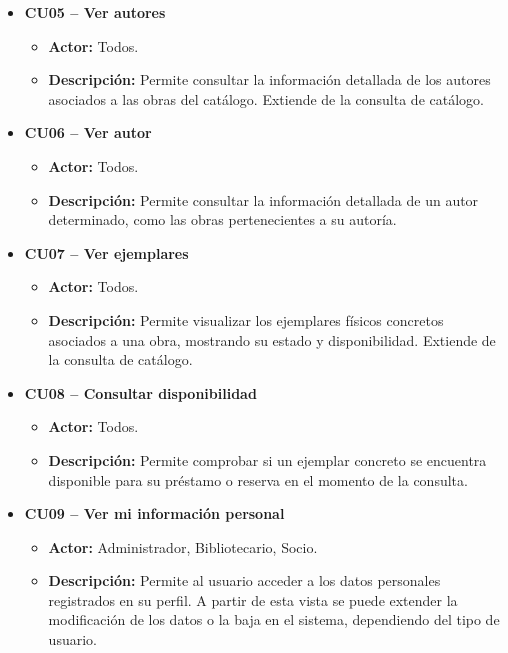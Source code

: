 \begin{itemize}
	\item \textbf{CU05 -- Ver autores}
	\begin{itemize}
		\item \textbf{Actor:} Todos.
		\item \textbf{Descripción:} Permite consultar la información detallada de los autores asociados a las obras del catálogo. Extiende de la consulta de catálogo.
	\end{itemize}
	
	\item \textbf{CU06 -- Ver autor}
	\begin{itemize}
		\item \textbf{Actor:} Todos.
		\item \textbf{Descripción:} Permite consultar la información detallada de un autor determinado, como las obras pertenecientes a su autoría.
	\end{itemize}
	
	\item \textbf{CU07 -- Ver ejemplares}
	\begin{itemize}
		\item \textbf{Actor:} Todos.
		\item \textbf{Descripción:} Permite visualizar los ejemplares físicos concretos asociados a una obra, mostrando su estado y disponibilidad. Extiende de la consulta de catálogo.
	\end{itemize}
	
	\item \textbf{CU08 -- Consultar disponibilidad}
	\begin{itemize}
		\item \textbf{Actor:} Todos.
		\item \textbf{Descripción:} Permite comprobar si un ejemplar concreto se encuentra disponible para su préstamo o reserva en el momento de la consulta.
	\end{itemize}
	
	\item \textbf{CU09 -- Ver mi información personal}
	\begin{itemize}
		\item \textbf{Actor:} Administrador, Bibliotecario, Socio.
		\item \textbf{Descripción:} Permite al usuario acceder a los datos personales registrados en su perfil. A partir de esta vista se puede extender la modificación de los datos o la baja en el sistema, dependiendo del tipo de usuario.
	\end{itemize}
	

\end{itemize}
